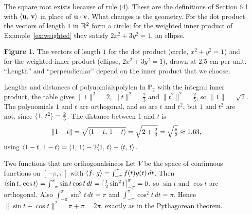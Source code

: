 \documentclass[11pt]{article}
\begin{document}
The square root exists because of rule (4). These are the definitions of Section 6.1 with $\langle \mathbf{u},\,\mathbf{v}\rangle$ in place of $\mathbf{u}\cdot\mathbf{v}$. What changes is the geometry. For the dot product the vectors of length $1$ in $\mathbb{R}^2$ form a circle; for the weighted inner product of Example~\ref{ex:weighted} they satisfy $2x^2+3y^2=1$, an ellipse.

\begin{center}
\end{center}

\noindent\textbf{Figure 1.} The vectors of length $1$ for the dot product (circle, $x^2+y^2=1$) and for the weighted inner product (ellipse, $2x^2+3y^2=1$), drawn at 2.5 cm per unit. ``Length'' and ``perpendicular'' depend on the inner product that we choose.

\begin{exmp}{Lengths and distances of polynomials}{polylen}
In $\mathbb{P}_2$ with the integral inner product, the table gives $\lVert1\rVert^2=2$, $\lVert t\rVert^2=\tfrac23$ and $\lVert t^2\rVert^2=\tfrac25$, so $\lVert1\rVert=\sqrt2$. The polynomials $1$ and $t$ are orthogonal, and so are $t$ and $t^2$, but $1$ and $t^2$ are not, since $\langle 1,\,t^2\rangle=\tfrac23$. The distance between $1$ and $t$ is
\[
\lVert1-t\rVert=\sqrt{\langle 1-t,\,1-t\rangle}=\sqrt{2+\tfrac23}=\sqrt{\tfrac83}\approx1.63 ,
\]
using $\langle 1-t,\,1-t\rangle=\langle 1,\,1\rangle-2\langle 1,\,t\rangle+\langle t,\,t\rangle$.
\end{exmp}

\begin{exmp}{Two functions that are orthogonal}{sincos}
Let $V$ be the space of continuous functions on $[-\pi,\pi]$ with $\langle f,\,g\rangle=\int_{-\pi}^{\pi}f(t)g(t)\,dt$. Then $\langle \sin t,\,\cos t\rangle=\int_{-\pi}^{\pi}\sin t\cos t\,dt=\bigl[\tfrac12\sin^2t\bigr]_{-\pi}^{\pi}=0$, so $\sin t$ and $\cos t$ are orthogonal. Also $\int_{-\pi}^{\pi}\sin^2t\,dt=\pi$ and $\int_{-\pi}^{\pi}\cos^2t\,dt=\pi$. Hence $\lVert\sin t+\cos t\rVert^2=\pi+\pi=2\pi$, exactly as in the Pythagorean theorem.
\end{exmp}
\end{document}
